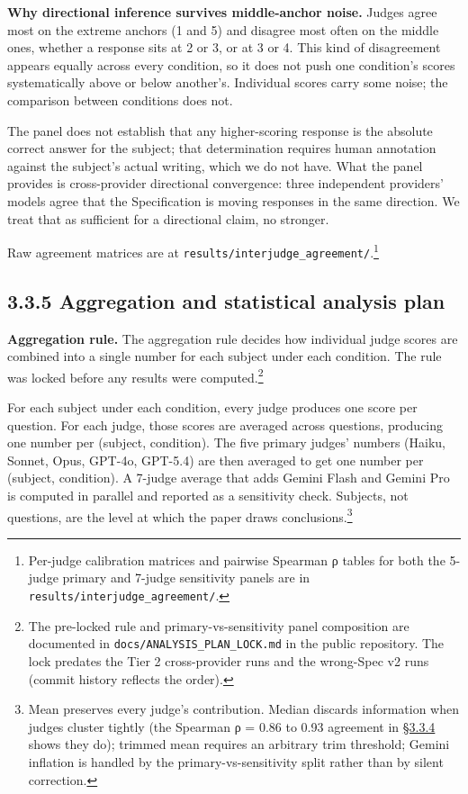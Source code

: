 \textbf{Why directional inference survives middle-anchor noise.} Judges
agree most on the extreme anchors (1 and 5) and disagree most often on
the middle ones, whether a response sits at 2 or 3, or at 3 or 4. This
kind of disagreement appears equally across every condition, so it does
not push one condition's scores systematically above or below another's.
Individual scores carry some noise; the comparison between conditions
does not.

The panel does not establish that any higher-scoring response is the
absolute correct answer for the subject; that determination requires
human annotation against the subject's actual writing, which we do not
have. What the panel provides is cross-provider directional convergence:
three independent providers' models agree that the Specification is
moving responses in the same direction. We treat that as sufficient for
a directional claim, no stronger.

Raw agreement matrices are at
\texttt{results/interjudge\_agreement/}.\footnote{Per-judge calibration
  matrices and pairwise Spearman ρ tables for both the 5-judge primary
  and 7-judge sensitivity panels are in
  \texttt{results/interjudge\_agreement/}.}

\hypertarget{aggregation-and-statistical-analysis-plan}{%
\subsection{3.3.5 Aggregation and statistical analysis
plan}\label{aggregation-and-statistical-analysis-plan}}

\textbf{Aggregation rule.} The aggregation rule decides how individual
judge scores are combined into a single number for each subject under
each condition. The rule was locked before any results were
computed.\footnote{The pre-locked rule and primary-vs-sensitivity panel
  composition are documented in \texttt{docs/ANALYSIS\_PLAN\_LOCK.md} in
  the public repository. The lock predates the Tier 2 cross-provider
  runs and the wrong-Spec v2 runs (commit history reflects the order).}

For each subject under each condition, every judge produces one score
per question. For each judge, those scores are averaged across
questions, producing one number per (subject, condition). The five
primary judges' numbers (Haiku, Sonnet, Opus, GPT-4o, GPT-5.4) are then
averaged to get one number per (subject, condition). A 7-judge average
that adds Gemini Flash and Gemini Pro is computed in parallel and
reported as a sensitivity check. Subjects, not questions, are the level
at which the paper draws conclusions.\footnote{Mean preserves every
  judge's contribution. Median discards information when judges cluster
  tightly (the Spearman ρ = 0.86 to 0.93 agreement in \hyperref[inter-judge-agreement]{§3.3.4} shows they
  do); trimmed mean requires an arbitrary trim threshold; Gemini
  inflation is handled by the primary-vs-sensitivity split rather than
  by silent correction.}

